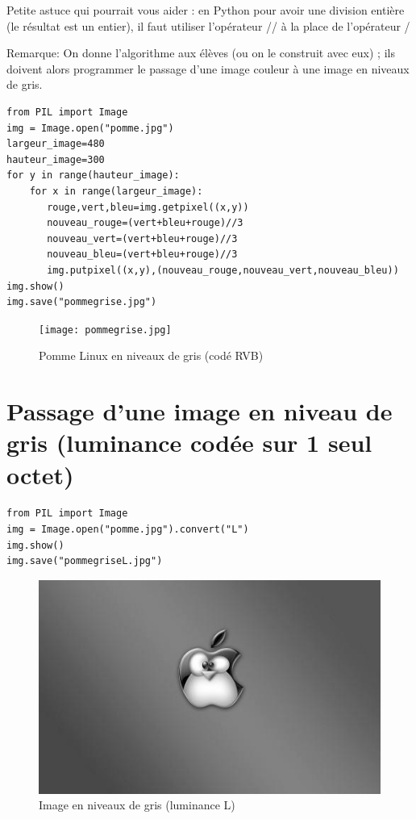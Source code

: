 \documentclass[11pt]{article}
\begin{document}
Petite astuce qui pourrait vous aider : en Python pour avoir une division entière (le résultat est un entier), il faut utiliser l'opérateur // à la place de l'opérateur / 

Remarque: On donne l'algorithme aux élèves (ou on le construit avec eux) ; ils doivent alors programmer le passage d'une image couleur à une image en niveaux de gris.


\begin{verbatim}
from PIL import Image
img = Image.open("pomme.jpg")
largeur_image=480
hauteur_image=300
for y in range(hauteur_image):
    for x in range(largeur_image):
       rouge,vert,bleu=img.getpixel((x,y))
       nouveau_rouge=(vert+bleu+rouge)//3
       nouveau_vert=(vert+bleu+rouge)//3
       nouveau_bleu=(vert+bleu+rouge)//3
       img.putpixel((x,y),(nouveau_rouge,nouveau_vert,nouveau_bleu))
img.show()
img.save("pommegrise.jpg")
\end{verbatim}

\begin{figure}[htbp]
\centering
\texttt{[image: pommegrise.jpg]}
\caption{Pomme Linux en niveaux de gris (codé RVB)}
\end{figure}


\section{Passage d'une image en niveau de gris (luminance codée sur 1 seul octet)}
\label{sec:org298a645}

\begin{verbatim}
from PIL import Image
img = Image.open("pomme.jpg").convert("L")
img.show()
img.save("pommegriseL.jpg")
\end{verbatim}


\begin{figure}[htbp]
\centering
\includegraphics[width=.9\linewidth]{pommegriseL.jpg}
\caption{Image en niveaux de gris (luminance L)}
\end{figure}
\end{document}

